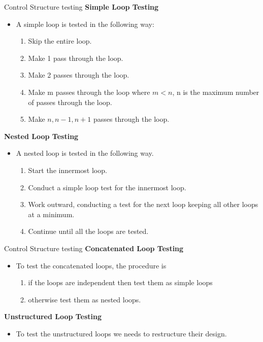 \documentclass{beamer}
\begin{document}
\begin{frame}{Control Structure testing}
\textbf{Simple Loop Testing}
	\begin{itemize}
		\item A simple loop is tested in the following way:
		\begin{enumerate}
			\item Skip the entire loop.
			\item Make 1 pass through the loop.
			\item Make 2 passes through the loop.
			\item Make m passes through the loop where $m<n$, n is the maximum number of passes through the loop.
			\item Make $n, n-1, n+1 $ passes through the loop.
		\end{enumerate}
	\end{itemize}
\textbf{Nested Loop Testing}
\begin{itemize}
	\item A nested loop is tested in the following way.
	\begin{enumerate}
		\item Start the innermost loop.
		\item Conduct a simple loop test for the innermost loop.
		\item Work outward, conducting a test for the next loop keeping all other loops at a minimum.
		\item Continue until all the loops are tested.
	\end{enumerate}
\end{itemize}
\end{frame}
\begin{frame}{Control Structure testing}
\textbf{Concatenated Loop Testing}
\begin{itemize}
	\item To test the concatenated loops, the procedure is
	\begin{enumerate}
		\item if the loops are independent then test them as simple loops \item otherwise test them as nested loops.
	\end{enumerate}
\end{itemize}
\textbf{Unstructured Loop Testing}
\begin{itemize}
	\item To test the unstructured loops we needs to restructure their design.
\end{itemize}
\end{frame}
\end{document}

